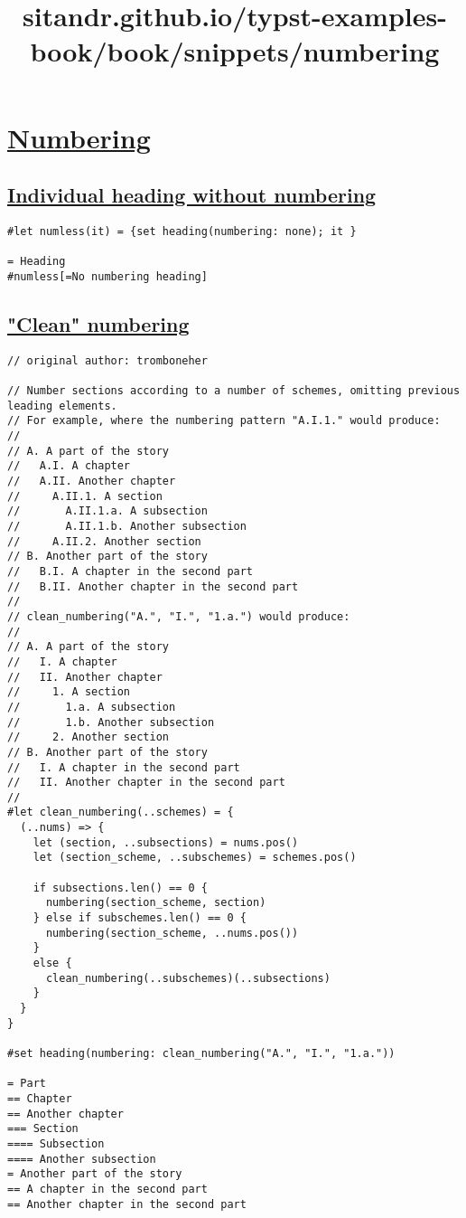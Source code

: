 \title{sitandr.github.io/typst-examples-book/book/snippets/numbering}

\section{\texorpdfstring{\hyperref[numbering]{Numbering}}{Numbering}}\label{numbering}

\subsection{\texorpdfstring{\hyperref[individual-heading-without-numbering]{Individual
heading without
numbering}}{Individual heading without numbering}}\label{individual-heading-without-numbering}

\begin{verbatim}
#let numless(it) = {set heading(numbering: none); it }

= Heading
#numless[=No numbering heading]
\end{verbatim}

\pandocbounded{}

\subsection{\texorpdfstring{\hyperref[clean-numbering]{"Clean"
numbering}}{"Clean" numbering}}\label{clean-numbering}

\begin{verbatim}
// original author: tromboneher

// Number sections according to a number of schemes, omitting previous leading elements.
// For example, where the numbering pattern "A.I.1." would produce:
//
// A. A part of the story
//   A.I. A chapter
//   A.II. Another chapter
//     A.II.1. A section
//       A.II.1.a. A subsection
//       A.II.1.b. Another subsection
//     A.II.2. Another section
// B. Another part of the story
//   B.I. A chapter in the second part
//   B.II. Another chapter in the second part
//
// clean_numbering("A.", "I.", "1.a.") would produce:
//
// A. A part of the story
//   I. A chapter
//   II. Another chapter
//     1. A section
//       1.a. A subsection
//       1.b. Another subsection
//     2. Another section
// B. Another part of the story
//   I. A chapter in the second part
//   II. Another chapter in the second part
//
#let clean_numbering(..schemes) = {
  (..nums) => {
    let (section, ..subsections) = nums.pos()
    let (section_scheme, ..subschemes) = schemes.pos()

    if subsections.len() == 0 {
      numbering(section_scheme, section)
    } else if subschemes.len() == 0 {
      numbering(section_scheme, ..nums.pos())
    }
    else {
      clean_numbering(..subschemes)(..subsections)
    }
  }
}

#set heading(numbering: clean_numbering("A.", "I.", "1.a."))

= Part
== Chapter
== Another chapter
=== Section
==== Subsection
==== Another subsection
= Another part of the story
== A chapter in the second part
== Another chapter in the second part
\end{verbatim}

